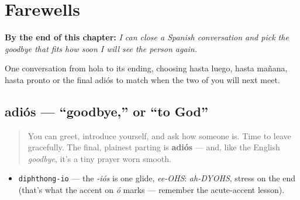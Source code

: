 
\chapter{Farewells}
\label{ch:farewells}

\begin{chapteropening}
\textbf{By the end of this chapter:} \emph{I can close a Spanish conversation and pick the goodbye that fits how soon I will see the person again.}

One conversation from hola to its ending, choosing hasta luego, hasta mañana, hasta pronto or the final adiós to match when the two of you will next meet.
\end{chapteropening}

\section[adiós]{adiós — \textquotedblleft{}goodbye,\textquotedblright{} or \textquotedblleft{}to God\textquotedblright{}}

\label{lesson:ES-C05-adios}



\begin{quote}
You can greet, introduce yourself, and ask how someone is. Time to leave gracefully. The final, plainest parting is \textbf{adiós} — and, like the English \emph{goodbye}, it's a tiny prayer worn smooth.
\end{quote}

\begin{sounds}
\begin{itemize}
\raggedright
  \item \texttt{diphthong-io} — the \emph{-iós} is one glide, \emph{ee-OHS}: \emph{ah-DYOHS}, stress on the end (that's what the accent on \emph{ó} marks — remember the acute-accent lesson).
\end{itemize}
\end{sounds}

